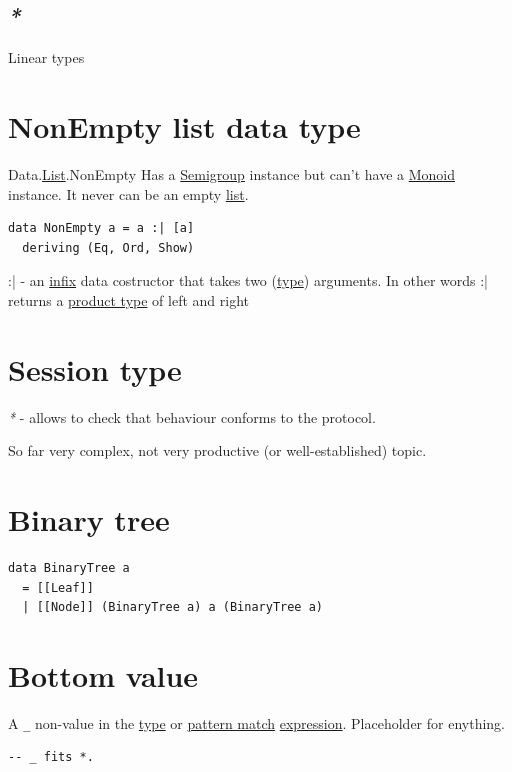 \documentclass[a4paper,14pt,oneside]{book}
\begin{document}
\subsection{\emph{*}}
\label{sec:org28afa78}

\label{orgc795577}Linear types

\section{\label{org8f52fc6}NonEmpty list data type}
\label{sec:orgdd3e71d}
Data.\hyperref[orga17c874]{List}.NonEmpty
Has a \hyperref[org171e6aa]{Semigroup} instance but can't have a \hyperref[org9e1ff1f]{Monoid} instance. It never can be an empty \hyperref[orga17c874]{list}.

\begin{verbatim}
data NonEmpty a = a :| [a]
  deriving (Eq, Ord, Show)
\end{verbatim}

:| - an \hyperref[orge5faf81]{infix} data costructor that takes two (\hyperref[orgde40363]{type}) arguments. In other words :| returns a \hyperref[org744e9f4]{product type} of left and right

\section{\label{org5cef3b8}Session type}
\label{sec:orga4c9502}
\emph{*} - allows to check that behaviour conforms to the protocol.

So far very complex, not very productive (or well-established) topic.

\section{\label{org8dabfea}Binary tree}
\label{sec:orgf763c4d}
\begin{verbatim}
data BinaryTree a
  = [[Leaf]]
  | [[Node]] (BinaryTree a) a (BinaryTree a)
\end{verbatim}

\section{\label{orge66b212}Bottom value}
\label{sec:orgcd77d32}
A \texttt{\_} non-value in the \hyperref[orgde40363]{type} or \hyperref[org08c63e1]{pattern match} \hyperref[org6064e19]{expression}. Placeholder for enything.

\begin{verbatim}
-- _ fits *.
\end{verbatim}
\end{document}
